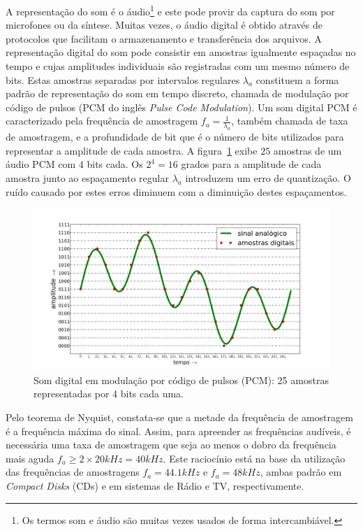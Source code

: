 A representação do som é o áudio\footnote{Os termos
som e áudio são muitas vezes usados de forma intercambiável.\cite{Everest}} e este pode provir da captura do som por microfones ou da síntese. Muitas vezes, o áudio digital é obtido através de protocolos que facilitam o armazenamento e transferência dos arquivos.\cite{procFala} A representação digital do som pode consistir em amostras igualmente espaçadas no tempo e cujas amplitudes individuais são registradas com um mesmo número de bits. Estas amostras separadas por intervalos regulares $\lambda_a$ constituem a forma padrão de representação do som em tempo discreto, chamada de modulação por código de pulsos (PCM do inglês \emph{Pulse Code Modulation}).
Um som digital PCM é caracterizado pela frequência de amostragem $f_a=\frac{1}{\lambda_a}$, também chamada de taxa de amostragem, e a profundidade de bit que é o número de bits utilizados para representar a amplitude de cada amostra.\cite{protocolosAudio} A figura~\ref{fig:PCM} exibe $25$ amostras de um áudio PCM com $4$ bits cada. Os $2^4=16$ grados para a amplitude de cada amostra junto ao espaçamento regular $\lambda_a$ introduzem um erro de quantização. O ruído causado por estes erros diminuem com a diminuição destes espaçamentos. 


\begin{figure}[h!]
    \centering
        \includegraphics[width=\textwidth]{figuras/pcm}
    \caption{Som digital em modulação por código de pulsos (PCM): 25 amostras representadas por 4 bits cada uma.}
        \label{fig:PCM}
\end{figure}

Pelo teorema de Nyquist, constata-se que a metade da frequência de amostragem é a frequência máxima do sinal. Assim, para apreender as frequências audíveis, é necessária uma taxa de amostragem que seja ao menos o dobro da frequência mais aguda $f_a \geq 2\times 20kHz=40kHz$. Este raciocínio está na base da utilização das frequências de amostragens $f_a=44.1kHz$ e $f_a=48kHz$, ambas padrão em \emph{Compact Disks} (CDs) e em sistemas de Rádio e TV, respectivamente.\cite{protocolosAudio}


